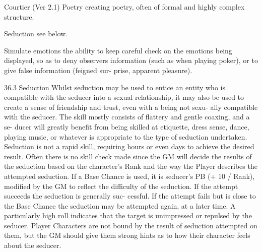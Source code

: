 \begin{Chapter}{Courtier (Ver 2.1)}
Poetry creating poetry, often of formal and highly 
complex structure. 

Seduction see below. 

Simulate  emotions  the  ability  to  keep  careful 
check  on  the  emotions  being  displayed,  so  as  to 
deny observers information (such as when playing 
poker),  or  to  give  false  information  (feigned  sur-
prise, apparent pleasure). 

36.3 Seduction 
Whilst  seduction  may  be  used  to  entice  an  entity 
who  is  compatible  with  the  seducer  into  a  sexual 
relationship,  it  may  also  be  used  to  create  a  sense 
of friendship and trust, even with a being not sexu-
ally  compatible  with  the  seducer.  The  skill  mostly 
consists  of  flattery  and  gentle  coaxing,  and  a  se-
ducer  will  greatly  benefit  from  being  skilled  at 
etiquette,  dress  sense,  dance,  playing  music,  or 
whatever  is  appropriate  to  the  type  of  seduction 
undertaken. Seduction is not a rapid skill, requiring 
hours  or  even  days  to  achieve  the  desired  result. 
Often  there  is  no  skill  check  made  since  the  GM 
will decide the results of the seduction based on the 
character’s Rank and the way the Player describes 
the attempted seduction. If a Base Chance is used, 
it  is  seducer’s  PB  (+  10  /  Rank),  modified  by  the 
GM to reflect the difficulty of the seduction. If the 
attempt  succeeds  the  seduction  is  generally  suc-
cessful. If the attempt fails but is close to the Base 
Chance the seduction may be attempted again, at a 
later time. A particularly high roll indicates that the 
target  is  unimpressed  or  repulsed  by  the  seducer. 
Player  Characters  are  not  bound  by  the  result  of 
seduction  attempted  on  them,  but  the  GM  should 
give  them  strong  hints  as  to  how  their  character 
feels about the seducer. 

\end{Chapter}
